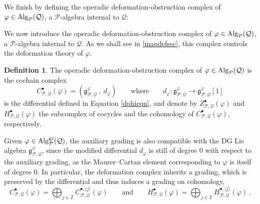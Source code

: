 \documentclass[11pt]{amsart}
\numberwithin{equation}{section}
\theoremstyle{definition}
\newtheorem{defn}[theo]{Definition}
\newcommand{\bb}{\mathbb}
\newcommand{\mc}{\mathcal}
\newcommand{\mf}{\mathfrak}
\newcommand{\gd}{{\textup{gr}}}
\newcommand{\Alg}{{\textup{Alg}}}
\newcommand{\0}{{\textbf{0}}}
\newcommand{\Z}{\bb Z}
\newcommand{\g}{{\mf{g}}}
\def\PP{{\mc P}}
\def\QQ{{\mc Q}}
\def \mf{\mathfrak}
\begin{document}
We finish by defining the operadic deformation-obstruction complex of $\varphi \in \Alg_{\mc P}(\mc Q)$, a $\mc P$-algebra internal to $\mc Q$:

We now introduce the operadic deformation-obstruction complex of $\varphi\in \Alg_{\PP}(\QQ)$, a $\PP$-algebra internal to $\QQ$. As we shall see in \ref{mapdefsec}, this complex controls the deformation theory of $\varphi$.

\begin{defn}\label{defobscxdefn} The operadic deformation-obstruction complex of $\varphi \in \Alg_{\mc P}(\mc Q)$ is the cochain complex
\[ C^\bullet_{\mc P,\mc Q}(\varphi)=(\g^\varphi_{\mc P,\mc Q} \ , \ d_\varphi ) \qquad\text{where}\qquad  d_\varphi:\g^\varphi_{\mc P,\mc Q} \to \g^\varphi_{\mc P,\mc Q} [1]   \]
is the differential defined in Equation \ref{dphieqn}, and denote by $Z^\bullet_{\mc P,\mc Q}(\varphi)$ and $H^\bullet_{\mc P, \mc Q}(\varphi)$ the subcomplex of cocycles and the cohomology of $C^\bullet_{\mc P,\mc Q}(\varphi)$, respectively.
\end{defn}




Given $\varphi \in \Alg_{\mc P}^\gd(\mc Q)$, the auxiliary grading is also compatible with the DG Lie algebra $\g_{\mc P,\mc Q}^\varphi$, since the modified differential $d_\varphi$ is still of degree $0$ with respect to the auxiliary grading, as the Maurer--Cartan element corresponding to $\varphi$ is itself of degree $0$. In particular, the deformation complex inherits a grading, which is preserved by the differential and thus induces a grading on cohomology,
\[ 
C^\bullet_{\mc P,\mc Q}(\varphi) = \bigoplus_{j\in \Z} C^{\bullet,\langle j\rangle}_{\mc P,\mc Q}(\varphi)
\qquad \text{and} \qquad 
H^\bullet_{\mc P,\mc Q}(\varphi) = \bigoplus_{j\in \Z} H^{\bullet,\langle j\rangle}_{\mc P,\mc Q}(\varphi)~. 
\]
\end{document}
